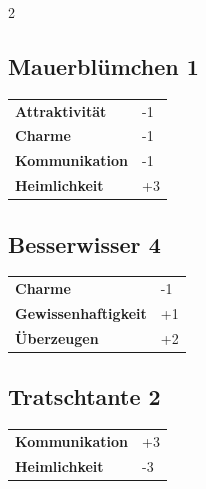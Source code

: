 \begin{multicols}{2}
\begin{tcolorbox}
    \subsection*{Mauerblümchen \hfill \small{1 }}
    \tcblower




\begin{tabular}{@{}ll@{}}
    \textbf{Attraktivität} & -1\\
    \textbf{Charme} & -1\\
    \textbf{Kommunikation} & -1\\
    \textbf{Heimlichkeit} & +3\\
\end{tabular}


\end{tcolorbox}

\begin{tcolorbox}
    \subsection*{Besserwisser \hfill \small{4 }}
    \tcblower




\begin{tabular}{@{}ll@{}}
    \textbf{Charme} & -1\\
    \textbf{Gewissenhaftigkeit} & +1\\
    \textbf{Überzeugen} & +2\\
\end{tabular}


\end{tcolorbox}

\begin{tcolorbox}
    \subsection*{Tratschtante \hfill \small{2 }}
    \tcblower




\begin{tabular}{@{}ll@{}}
    \textbf{Kommunikation} & +3\\
    \textbf{Heimlichkeit} & -3\\
\end{tabular}


\end{tcolorbox}
\end{multicols}
